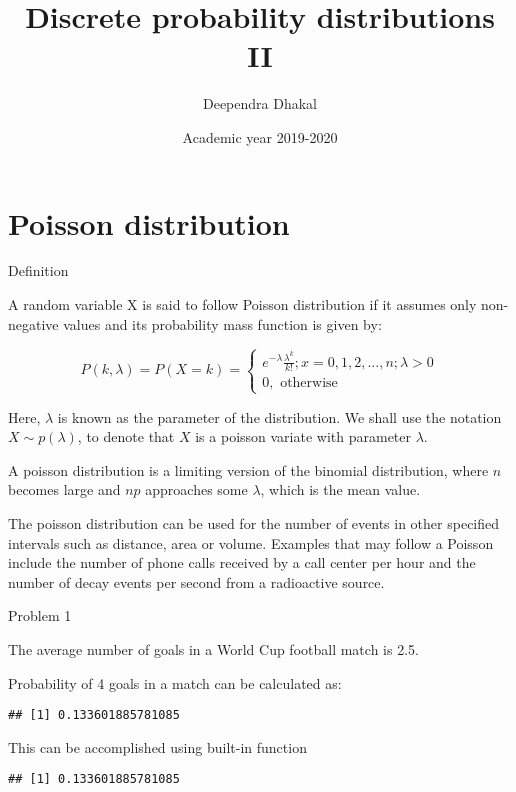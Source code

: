 \documentclass[ignorenonframetext,aspectratio=169]{beamer}
\title{Discrete probability distributions II}
\author{Deependra Dhakal}
\institute{\url{https://rookie.rbind.io}}
\date{Academic year 2019-2020}
\begin{document}
\frame{\titlepage}

\begin{frame}
\tableofcontents[hideallsubsections]
\end{frame}
\hypertarget{poisson-distribution}{%
\section{Poisson distribution}\label{poisson-distribution}}

\begin{frame}{Definition}
\protect\hypertarget{definition}{}

A random variable X is said to follow Poisson distribution if it assumes
only non-negative values and its probability mass function is given by:

\[P(k, \lambda) = P(X = k) =  
  \begin{cases} 
    e^{-\lambda}\frac{\lambda^k}{k!}; x = 0, 1, 2, ..., n; \lambda > 0 \\
    0, \text{ otherwise}
  \end{cases}
\]

Here, \(\lambda\) is known as the parameter of the distribution. We
shall use the notation \(X \sim p(\lambda)\), to denote that \(X\) is a
poisson variate with parameter \(\lambda\).

\end{frame}

\begin{frame}{}
\protect\hypertarget{section}{}

A poisson distribution is a limiting version of the binomial
distribution, where \(n\) becomes large and \(np\) approaches some
\(\lambda\), which is the mean value.

The poisson distribution can be used for the number of events in other
specified intervals such as distance, area or volume. Examples that may
follow a Poisson include the number of phone calls received by a call
center per hour and the number of decay events per second from a
radioactive source.

\end{frame}

\begin{frame}[fragile]{Problem 1}
\protect\hypertarget{problem-1}{}

The average number of goals in a World Cup football match is 2.5.

Probability of 4 goals in a match can be calculated as:

\begin{verbatim}
## [1] 0.133601885781085
\end{verbatim}

This can be accomplished using built-in function

\begin{verbatim}
## [1] 0.133601885781085
\end{verbatim}

\end{frame}
\end{document}
